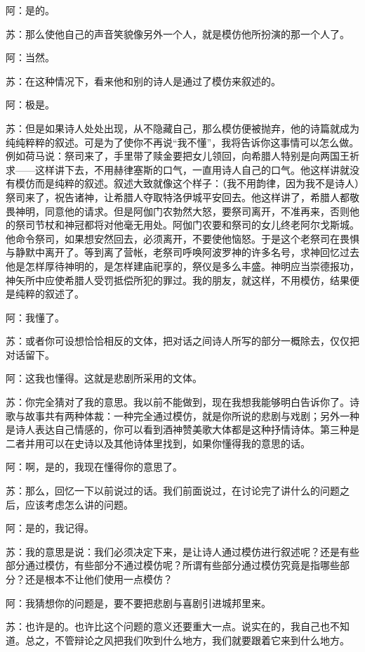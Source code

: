 \documentclass[12pt,oneside]{book}
\begin{document}
阿：是的。

苏：那么使他自己的声音笑貌像另外一个人，就是模仿他所扮演的那一个人了。

阿：当然。

苏：在这种情况下，看来他和别的诗人是通过了模仿来叙述的。

阿：极是。

苏：但是如果诗人处处出现，从不隐藏自己，那么模仿便被抛弃，他的诗篇就成为纯纯粹粹的叙述。可是为了使你不再说“我不懂”，我将告诉你这事情可以怎么做。例如荷马说：祭司来了，手里带了赎金要把女儿领回，向希腊人特别是向两国王祈求——这样讲下去，不用赫律塞斯的口气，一直用诗人自己的口气。他这样讲就没有模仿而是纯粹的叙述。叙述大致就像这个样子：（我不用韵律，因为我不是诗人）祭司来了，祝告诸神，让希腊人夺取特洛伊城平安回去。他这样讲了，希腊人都敬畏神明，同意他的请求。但是阿伽门农勃然大怒，要祭司离开，不准再来，否则他的祭司节杖和神冠都将对他毫无用处。阿伽门农要和祭司的女儿终老阿尔戈斯城。他命令祭司，如果想安然回去，必须离开，不要使他恼怒。于是这个老祭司在畏惧与静默中离开了。等到离了营帐，老祭司呼唤阿波罗神的许多名号，求神回忆过去他是怎样厚待神明的，是怎样建庙祀享的，祭仪是多么丰盛。神明应当崇德报功，神矢所中应使希腊人受罚抵偿所犯的罪过。我的朋友，就这样，不用模仿，结果便是纯粹的叙述了。

阿：我懂了。

苏：或者你可设想恰恰相反的文体，把对话之间诗人所写的部分一概除去，仅仅把对话留下。

阿：这我也懂得。这就是悲剧所采用的文体。

苏：你完全猜对了我的意思。我以前不能做到，现在我想我能够明白告诉你了。诗歌与故事共有两种体裁：一种完全通过模仿，就是你所说的悲剧与戏剧；另外一种是诗人表达自己情感的，你可以看到酒神赞美歌大体都是这种抒情诗体。第三种是二者并用可以在史诗以及其他诗体里找到，如果你懂得我的意思的话。

阿：啊，是的，我现在懂得你的意思了。

苏：那么，回忆一下以前说过的话。我们前面说过，在讨论完了讲什么的问题之后，应该考虑怎么讲的问题。

阿：是的，我记得。

苏：我的意思是说：我们必须决定下来，是让诗人通过模仿进行叙述呢？还是有些部分通过模仿，有些部分不通过模仿呢？所谓有些部分通过模仿究竟是指哪些部分？还是根本不让他们使用一点模仿？

阿：我猜想你的问题是，要不要把悲剧与喜剧引进城邦里来。

苏：也许是的。也许比这个问题的意义还要重大一点。说实在的，我自己也不知道。总之，不管辩论之风把我们吹到什么地方，我们就要跟着它来到什么地方。
\end{document}
